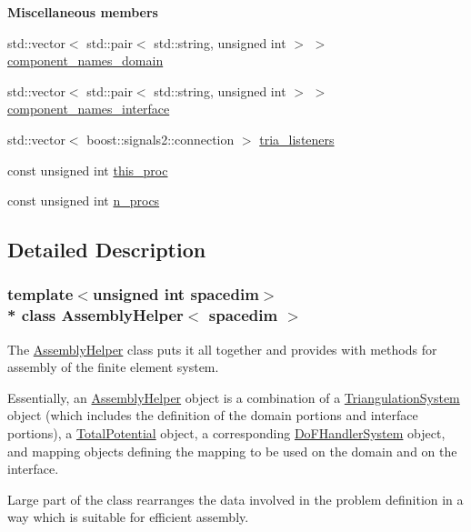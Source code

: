 \begin{Indent}{\bf Miscellaneous members}\par
\begin{DoxyCompactItemize}
\item 
std\+::vector$<$ std\+::pair$<$ std\+::string, unsigned int $>$ $>$ \hyperlink{class_assembly_helper_af5e29448f133863a1859be8bfbb300c6}{component\+\_\+names\+\_\+domain}
\item 
std\+::vector$<$ std\+::pair$<$ std\+::string, unsigned int $>$ $>$ \hyperlink{class_assembly_helper_a7ae6ae2ec356cbb7b830d968315d280c}{component\+\_\+names\+\_\+interface}
\item 
std\+::vector$<$ boost\+::signals2\+::connection $>$ \hyperlink{class_assembly_helper_a228cec028ab5126d25c3ebf0e12a17a6}{tria\+\_\+listeners}
\item 
const unsigned int \hyperlink{class_assembly_helper_a2aad83ae1bfe5338794cf9b50848469a}{this\+\_\+proc}
\item 
const unsigned int \hyperlink{class_assembly_helper_a87945d87baf37637673fd124b3803fd5}{n\+\_\+procs}
\end{DoxyCompactItemize}
\end{Indent}


\subsection{Detailed Description}
\subsubsection*{template$<$unsigned int spacedim$>$\\*
class Assembly\+Helper$<$ spacedim $>$}

The \hyperlink{class_assembly_helper}{Assembly\+Helper} class puts it all together and provides with methods for assembly of the finite element system.

Essentially, an \hyperlink{class_assembly_helper}{Assembly\+Helper} object is a combination of a \hyperlink{class_triangulation_system}{Triangulation\+System} object (which includes the definition of the domain portions and interface portions), a \hyperlink{class_total_potential}{Total\+Potential} object, a corresponding \hyperlink{class_do_f_handler_system}{Do\+F\+Handler\+System} object, and mapping objects defining the mapping to be used on the domain and on the interface.

Large part of the class rearranges the data involved in the problem definition in a way which is suitable for efficient assembly.


